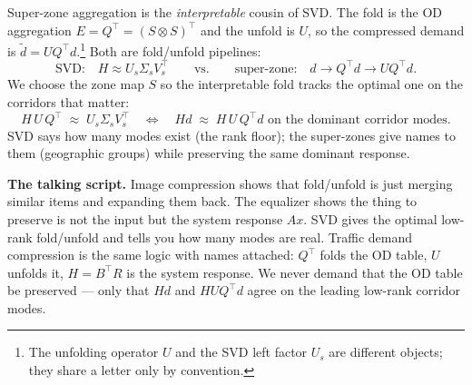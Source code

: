 \documentclass[11pt]{article}
\begin{document}
Super-zone aggregation is the \emph{interpretable} cousin of SVD. The fold is
the OD aggregation $E=Q^{\!\top}=(S\otimes S)^{\!\top}$ and the unfold is
$U$, so the compressed demand is $\tilde d = U Q^{\!\top} d$.\footnote{The
unfolding operator $U$ and the SVD left factor $U_s$ are different objects;
they share a letter only by convention.} Both are fold/unfold pipelines:
\[
\text{SVD:}\quad H \approx U_s\Sigma_s V_s^{\!\top}
\qquad\text{vs.}\qquad
\text{super-zone:}\quad d \to Q^{\!\top}d \to U Q^{\!\top} d .
\]
We choose the zone map $S$ so the interpretable fold tracks the optimal one on
the corridors that matter:
\[
\boxed{\,H\,U\,Q^{\!\top} \;\approx\; U_s\Sigma_s V_s^{\!\top}
\quad\Longleftrightarrow\quad
H d \;\approx\; H\,U\,Q^{\!\top} d \text{ on the dominant corridor modes.}\,}
\]
SVD says how many modes exist (the rank floor); the super-zones give names to
them (geographic groups) while preserving the same dominant response.

\begin{keybox}
\textbf{The talking script.} Image compression shows that fold/unfold is just
merging similar items and expanding them back. The equalizer shows the thing
to preserve is not the input but the system response $Ax$. SVD gives the
optimal low-rank fold/unfold and tells you how many modes are real. Traffic
demand compression is the same logic with names attached: $Q^{\!\top}$ folds
the OD table, $U$ unfolds it, $H=B^{\!\top}R$ is the system response. We never
demand that the OD table be preserved --- only that $Hd$ and $H U Q^{\!\top}d$
agree on the leading low-rank corridor modes.
\end{keybox}
\end{document}
